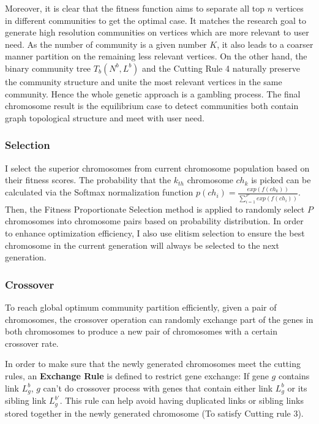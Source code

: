 Moreover, it is clear that the fitness function aims to separate all top $n$ vertices in different communities to get the optimal case. It matches the research goal to generate high resolution communities on vertices which are more relevant to user need. As the number of community is a given number $K$, it also leads to a coarser manner partition on the remaining less relevant vertices. On the other hand, the binary community tree $T_{b}(N^{b},L^{b})$ and the Cutting Rule 4 naturally preserve the community structure and unite the most relevant vertices in the same community. Hence the whole genetic approach is a gambling process. The final chromosome result is the equilibrium case to detect communities both contain graph topological structure and meet with user need.


\subsubsection{Selection}

I select the superior chromosomes from current chromosome population based on their fitness scores. The probability that the $k_{th}$ chromosome $ch_k$ is picked can be calculated via the Softmax normalization function $p(ch_{i}) = \frac{exp(f(ch_{k}))}{\sum_{i=1}^{P}exp(f(ch_{i}))}$. Then, the Fitness Proportionate Selection method is applied to randomly select $P$ chromosomes into chromosome pairs based on probability distribution. In order to enhance optimization efficiency, I also use elitism selection to ensure the best chromosome in the current generation will always be selected to the next generation. 

\subsubsection{Crossover} 

To reach global optimum community partition efficiently, given a pair of chromosomes, the crossover operation can randomly exchange part of the genes in both chromosomes to produce a new pair of chromosomes with a certain crossover rate.

In order to make sure that the newly generated chromosomes meet the cutting rules, an \textbf{Exchange Rule} is defined to restrict gene exchange: If gene \textit{$g$} contains link $L^{b}_{g}$, \textit{$g$} can't do crossover process with genes that contain either link $L^{b}_{g}$ or its sibling link $L^{b'}_{g}$. This rule can help avoid having duplicated links or sibling links stored together in the newly generated chromosome (To satisfy Cutting rule 3). 

